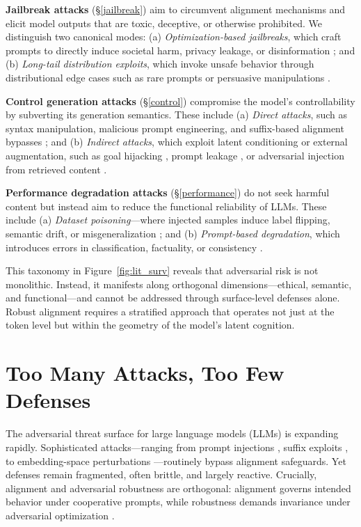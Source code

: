 \textbf{Jailbreak attacks} (\S\ref{jailbreak}) aim to circumvent alignment mechanisms and elicit model outputs that are toxic, deceptive, or otherwise prohibited. We distinguish two canonical modes: (a) \emph{Optimization-based jailbreaks}, which craft prompts to directly induce societal harm, privacy leakage, or disinformation \cite{wu2024llms, pair23, tap23}; and (b) \emph{Long-tail distribution exploits}, which invoke unsafe behavior through distributional edge cases such as rare prompts or persuasive manipulations \cite{jiang2023promptpacker, schulhoff2023hackaprompt}.

\textbf{Control generation attacks} (\S\ref{control}) compromise the model’s controllability by subverting its generation semantics. These include (a) \emph{Direct attacks}, such as syntax manipulation, malicious prompt engineering, and suffix-based alignment bypasses \cite{jiang2023promptpacker, schulhoff2023hackaprompt}; and (b) \emph{Indirect attacks}, which exploit latent conditioning or external augmentation, such as goal hijacking \cite{chen2024pseudo}, prompt leakage \cite{li2024pleak}, or adversarial injection from retrieved content \cite{greshake2023indirect}.

\textbf{Performance degradation attacks} (\S\ref{performance}) do not seek harmful content but instead aim to reduce the functional reliability of LLMs. These include (a) \emph{Dataset poisoning}—where injected samples induce label flipping, semantic drift, or misgeneralization \cite{greshake2023indirect}; and (b) \emph{Prompt-based degradation}, which introduces errors in classification, factuality, or consistency \cite{greshake2023indirect}.

This taxonomy in Figure~\ref{fig:lit_surv} reveals that adversarial risk is not monolithic. Instead, it manifests along orthogonal dimensions—ethical, semantic, and functional—and cannot be addressed through surface-level defenses alone. Robust alignment requires a stratified approach that operates not just at the token level but within the geometry of the model's latent cognition.




\section{Too Many Attacks, Too Few Defenses}
\label{sec:appendix_attack_defense_gap}

The adversarial threat surface for large language models (LLMs) is expanding rapidly. Sophisticated attacks—ranging from prompt injections \cite{perez2023ignore}, suffix exploits \cite{zou2023universal}, to embedding-space perturbations \cite{schwinn2024attacking}—routinely bypass alignment safeguards. Yet defenses remain fragmented, often brittle, and largely reactive. Crucially, alignment and adversarial robustness are orthogonal: alignment governs intended behavior under cooperative prompts, while robustness demands invariance under adversarial optimization \cite{jain2023baseline, chen2023jailbreaker}.

